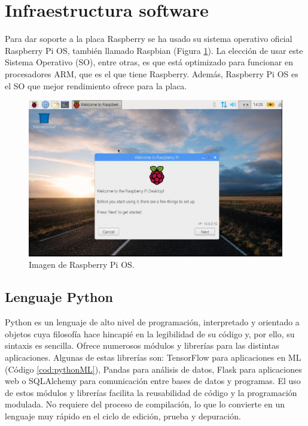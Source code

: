 \section{Infraestructura software}
Para dar soporte a la placa Raspberry se ha usado su sistema operativo oficial Raspberry Pi OS, también llamado Raspbian (Figura \ref{fig:raspbian}). La elección de usar este Sistema Operativo (SO), entre otras, es que está optimizado para funcionar en procesadores ARM, que es el que tiene Raspberry. Además, Raspberry Pi OS es el SO que mejor rendimiento ofrece para la placa.\\
\begin{figure} [h!]
  \begin{center}
    \includegraphics[width=14cm]{figs/raspbian}
  \end{center}
  \caption{Imagen de Raspberry Pi OS.}
  \label{fig:raspbian}
\end{figure}

\subsection{Lenguaje Python}
\label{sec:python}
Python es un lenguaje de alto nivel de programación, interpretado y orientado a objetos cuya filosofía hace hincapié en la legibilidad de su código y, por ello, su sintaxis es sencilla. Ofrece numerosos módulos y librerías para las distintas aplicaciones. Algunas de estas librerías son: TensorFlow para aplicaciones en ML (Código \ref{cod:pythonML}), Pandas para análisis de datos, Flask para aplicaciones web o SQLAlchemy para comunicación entre bases de datos y programas. El uso de estos módulos y librerías facilita la reusabilidad de código y la programación modulada. No requiere del proceso de compilación, lo que lo convierte en un lenguaje muy rápido en el ciclo de edición, prueba y depuración.\\


